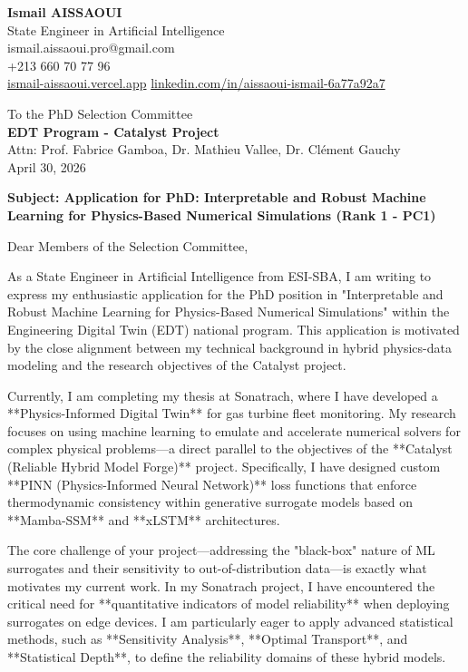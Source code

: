 \documentclass[a4paper,12pt]{article}
\begin{document}
\begin{flushleft}
    \textbf{Ismail AISSAOUI} \\
    State Engineer in Artificial Intelligence \\
    ismail.aissaoui.pro@gmail.com \\
    +213 660 70 77 96 \\
    \href{https://ismail-aissaoui.vercel.app}{ismail-aissaoui.vercel.app}
\href{https://linkedin.com/in/aissaoui-ismail-6a77a92a7}{linkedin.com/in/aissaoui-ismail-6a77a92a7}
\end{flushleft}

\begin{flushright}
    To the PhD Selection Committee \\
    \textbf{EDT Program - Catalyst Project} \\
    Attn: Prof. Fabrice Gamboa, Dr. Mathieu Vallee, Dr. Clément Gauchy \\
    \medskip
    April 30, 2026
\end{flushright}

\bigskip

\noindent \textbf{Subject: Application for PhD: Interpretable and Robust Machine Learning for Physics-Based Numerical Simulations (Rank 1 - PC1)}

\bigskip

Dear Members of the Selection Committee,

As a State Engineer in Artificial Intelligence from ESI-SBA, I am writing to express my enthusiastic application for the PhD position in "Interpretable and Robust Machine Learning for Physics-Based Numerical Simulations" within the Engineering Digital Twin (EDT) national program. This application is motivated by the close alignment between my technical background in hybrid physics-data modeling and the research objectives of the Catalyst project.

Currently, I am completing my thesis at Sonatrach, where I have developed a **Physics-Informed Digital Twin** for gas turbine fleet monitoring. My research focuses on using machine learning to emulate and accelerate numerical solvers for complex physical problems—a direct parallel to the objectives of the **Catalyst (Reliable Hybrid Model Forge)** project. Specifically, I have designed custom **PINN (Physics-Informed Neural Network)** loss functions that enforce thermodynamic consistency within generative surrogate models based on **Mamba-SSM** and **xLSTM** architectures.

The core challenge of your project—addressing the "black-box" nature of ML surrogates and their sensitivity to out-of-distribution data—is exactly what motivates my current work. In my Sonatrach project, I have encountered the critical need for **quantitative indicators of model reliability** when deploying surrogates on edge devices. I am particularly eager to apply advanced statistical methods, such as **Sensitivity Analysis**, **Optimal Transport**, and **Statistical Depth**, to define the reliability domains of these hybrid models. 
\end{document}
